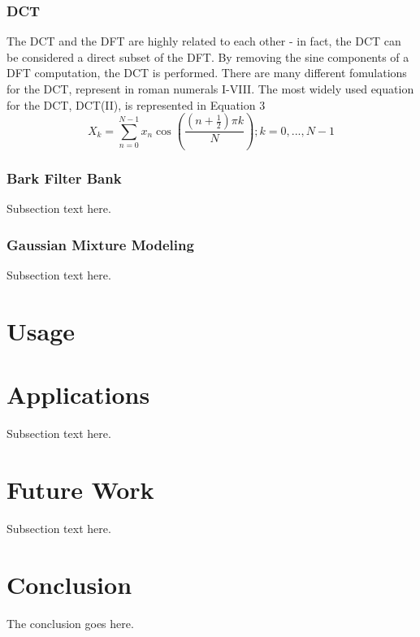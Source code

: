 \documentclass[journal]{IEEEtran}
\begin{document}
\subsubsection{DCT}
The DCT and the DFT are highly related to each other - in fact, the DCT can be considered a direct subset of the DFT. By removing the sine components
of a DFT computation, the DCT is performed. There are many different fomulations for the DCT, represent in roman numerals I-VIII. The most widely
used equation for the DCT, DCT(II), is represented in Equation 3
\begin{equation}
X_k = \sum_{n=0}^{N-1}x_n\cos(\frac{(n + \frac{1}{2})\pi k}{N});k = 0,...,N-1
\end{equation}
\subsubsection{Bark Filter Bank}
Subsection text here.
\subsubsection{Gaussian Mixture Modeling}
Subsection text here.

\section{Usage}

\section{Applications}
Subsection text here.

\section{Future Work}
Subsection text here.

\section{Conclusion}
The conclusion goes here.

\end{document}
